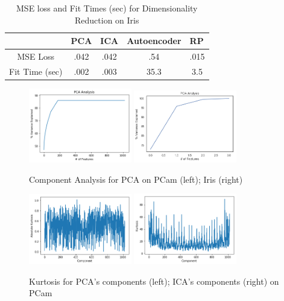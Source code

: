 \documentclass[letter]{article}
\begin{document}
\begin{table}
  \centering
  \begin{tabular}{l|l|l|l|l|}
  \cline{2-5}
                                 & PCA                        & ICA                        & Autoencoder              & RP                        \\ \hline
  \multicolumn{1}{|c|}{MSE Loss} & \multicolumn{1}{c|}{.042} & \multicolumn{1}{c|}{.042} & \multicolumn{1}{c|}{.54} & \multicolumn{1}{c|}{.015} \\ \hline
  \multicolumn{1}{|c|}{Fit Time (sec)} &\multicolumn{1}{c|}{.002}&\multicolumn{1}{c|}{.003}&\multicolumn{1}{c|}{35.3}&\multicolumn{1}{c|}{3.5} \\ \hline
  \end{tabular}
  \caption{MSE loss and Fit Times (sec) for Dimensionality Reduction on Iris}
\end{table}

\begin{figure}
  \centering
  \includegraphics[width=0.4\textwidth]{images/componentAnalysis.png}
  \includegraphics[width=0.4\textwidth]{images/irisComponentAnalysis.png}
  \caption{Component Analysis for PCA on PCam (left); Iris (right)}
\end{figure}

\begin{figure}
  \centering
  \includegraphics[width=0.4\textwidth]{images/pcaKurtosis.png}
  \includegraphics[width=0.4\textwidth]{images/icaKurtosis.png}
  \caption{Kurtosis for PCA's components (left); ICA's components (right) on PCam}
\end{figure}
\end{document}
